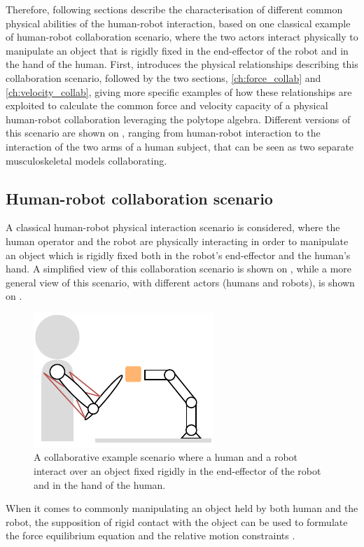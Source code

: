 Therefore, following sections describe the characterisation of different common physical abilities of the human-robot interaction, based on one classical example of human-robot collaboration scenario, where the two actors interact physically to manipulate an object that is rigidly fixed in the end-effector of the robot and in the hand of the human. First,  introduces the physical relationships describing this collaboration scenario, followed by the two sections, \ref{ch:force_collab} and \ref{ch:velocity_collab}, giving more specific examples of how these relationships are exploited to calculate the common force and velocity capacity of a physical human-robot collaboration leveraging the polytope algebra. 
Different versions of this scenario are shown on , ranging from human-robot interaction to the interaction of the two arms of a human subject, that can be seen as two separate musculoskeletal models collaborating.


\subsection{Human-robot collaboration scenario}
\label{ch:which_metric_which}

A classical human-robot physical interaction scenario is considered, where the human operator and the robot are physically interacting in order to manipulate an object which is rigidly fixed both in the robot's end-effector and the human's hand. A simplified view of this collaboration scenario is shown on , while a more general view of this scenario, with different actors (humans and robots), is shown on .

\begin{figure}
    \centering
    \includegraphics{Chapters/imgs/example_inter.pdf}
    \caption{A collaborative example scenario where a human and a robot interact over an object fixed rigidly in the end-effector of the robot and in the hand of the human.}
    \label{fig:table_inter}
\end{figure}
When it comes to commonly manipulating an object held by both human and the robot, the supposition of rigid contact with the object can be used to formulate the force equilibrium equation and the relative motion constraints \cite{Prattichizzo2016}. 

